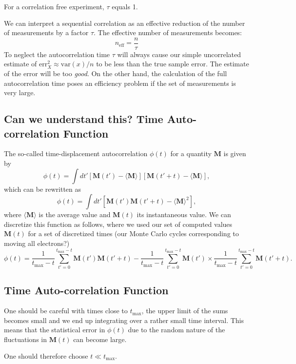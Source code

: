 \documentclass[%
oneside,                 %
final,                   %
10pt]{article}
\begin{document}
For a correlation free experiment, $\tau$
equals 1.

We can interpret a sequential
correlation as an effective reduction of the number of measurements by
a factor $\tau$. The effective number of measurements becomes:
\[
n_\mathrm{eff} = \frac{n}{\tau}
\]
To neglect the autocorrelation time $\tau$ will always cause our
simple uncorrelated estimate of $\mathrm{err}_X^2\approx \mathrm{var}(x)/n$ to
be less than the true sample error. The estimate of the error will be
too \emph{good}. On the other hand, the calculation of the full
autocorrelation time poses an efficiency problem if the set of
measurements is very large.

\subsection*{Can we understand this? Time Auto-correlation Function}

The so-called time-displacement autocorrelation $\phi(t)$ for a quantity $\mathbf{M}$ is given by
\[
\phi(t) = \int dt' \left[\mathbf{M}(t')-\langle \mathbf{M} \rangle\right]\left[\mathbf{M}(t'+t)-\langle \mathbf{M} \rangle\right],
\]
which can be rewritten as 
\[
\phi(t) = \int dt' \left[\mathbf{M}(t')\mathbf{M}(t'+t)-\langle \mathbf{M} \rangle^2\right],
\]
where $\langle \mathbf{M} \rangle$ is the average value and
$\mathbf{M}(t)$ its instantaneous value. We can discretize this function as follows, where we used our
set of computed values $\mathbf{M}(t)$ for a set of discretized times (our Monte Carlo cycles corresponding to moving all electrons?)
\[
\phi(t)  = \frac{1}{t_{\mathrm{max}}-t}\sum_{t'=0}^{t_{\mathrm{max}}-t}\mathbf{M}(t')\mathbf{M}(t'+t)
-\frac{1}{t_{\mathrm{max}}-t}\sum_{t'=0}^{t_{\mathrm{max}}-t}\mathbf{M}(t')\times
\frac{1}{t_{\mathrm{max}}-t}\sum_{t'=0}^{t_{\mathrm{max}}-t}\mathbf{M}(t'+t).
\label{eq:phitf}
\]

\subsection*{Time Auto-correlation Function}

One should be careful with times close to $t_{\mathrm{max}}$, the upper limit of the sums 
becomes small and we end up integrating over a rather small time interval. This means that the statistical
error in $\phi(t)$ due to the random nature of the fluctuations in $\mathbf{M}(t)$ can become large.

One should therefore choose $t \ll t_{\mathrm{max}}$.
\end{document}
